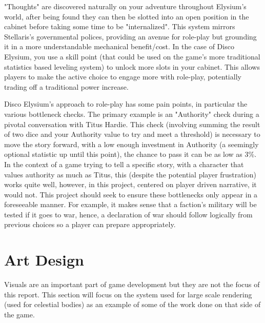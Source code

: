 \documentclass{report}
\begin{document}
"Thoughts" are discovered naturally on your adventure throughout Elysium's world, after being found they can then be slotted into an open position in the cabinet before taking some time to be "internalized". This system mirrors Stellaris's governmental polices, providing an avenue for role-play but grounding it in a more understandable mechanical benefit/cost. In the case of Disco Elysium, you use a skill point (that could be used on the game's more traditional statistics based leveling system) to unlock more slots in your cabinet. This allows players to make the active choice to engage more with role-play, potentially trading off a traditional power increase.

Disco Elysium's approach to role-play has some pain points, in particular the various bottleneck checks. The primary example is an "Authority" check during a pivotal conversation with Titus Hardie. This check (involving summing the result of two dice and your Authority value to try and meet a threshold) is necessary to move the story forward, with a low enough investment in Authority (a seemingly optional statistic up until this point), the chance to pass it can be as low as 3\%. In the context of a game trying to tell a specific story, with a character that values authority as much as Titus, this (despite the potential player frustration) works quite well, however, in this project, centered on player driven narrative, it would not. This project should seek to ensure these bottlenecks only appear in a foreseeable manner. For example, it makes sense that a faction's military will be tested if it goes to war, hence, a declaration of war should follow logically from previous choices so a player can prepare appropriately.

\section{Art Design}

Visuals are an important part of game development but they are not the focus of this report. This section will focus on the system used for large scale rendering (used for celestial bodies) as an example of some of the work done on that side of the game. 
\end{document}
